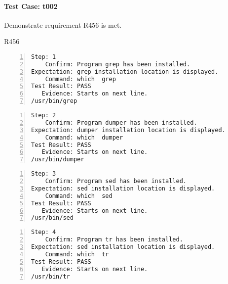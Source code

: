 \paragraph{Test Case: t002}
\begin{description}[align=right,leftmargin=*,labelindent=3cm]
\item[Purpose:] Demonstrate requirement R456 is met.
\item[Requirement:] R456
\end{description}
\begin{lstlisting}[numbers=left]
       Step: 1
    Confirm: Program grep has been installed.
Expectation: grep installation location is displayed.
    Command: which  grep 
Test Result: PASS
   Evidence: Starts on next line.
/usr/bin/grep

\end{lstlisting}
\begin{lstlisting}[numbers=left]
       Step: 2
    Confirm: Program dumper has been installed.
Expectation: dumper installation location is displayed.
    Command: which  dumper 
Test Result: PASS
   Evidence: Starts on next line.
/usr/bin/dumper

\end{lstlisting}
\begin{lstlisting}[numbers=left]
       Step: 3
    Confirm: Program sed has been installed.
Expectation: sed installation location is displayed.
    Command: which  sed 
Test Result: PASS
   Evidence: Starts on next line.
/usr/bin/sed

\end{lstlisting}
\begin{lstlisting}[numbers=left]
       Step: 4
    Confirm: Program tr has been installed.
Expectation: sed installation location is displayed.
    Command: which  tr 
Test Result: PASS
   Evidence: Starts on next line.
/usr/bin/tr

\end{lstlisting}
